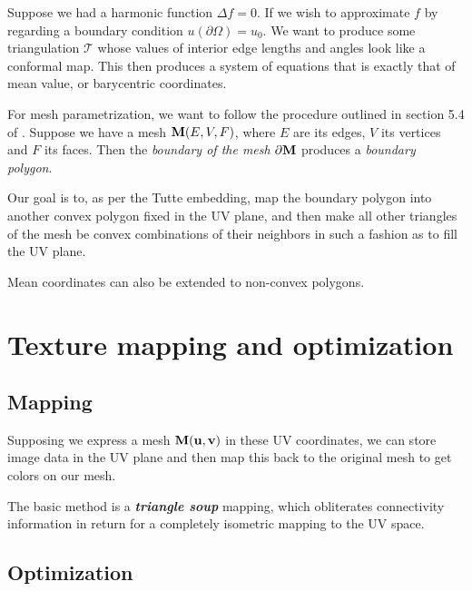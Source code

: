 \spa

Suppose we had a harmonic function $\Delta f = 0$. If we wish to
approximate $f$ by regarding a boundary condition 
$u(\partial \Omega) = u_0$. We want to produce some triangulation
$\mathcal{T}$ whose values of interior edge lengths and angles
look like a conformal map. This then produces a system of equations
that is exactly that of mean value, or barycentric coordinates.

\spa

For mesh parametrization, we want to follow
the procedure outlined in section 5.4 of \cite{floater2}.
Suppose we have a mesh $\bf{M}(E,V, F)$, where $E$ are its edges,
$V$ its vertices and $F$ its faces. Then the \emph{boundary of the mesh}
$\partial\bf{M}$ produces a \emph{boundary polygon}.

\spa

Our goal is to, as per the Tutte embedding, map the boundary polygon
into another convex polygon fixed in the UV plane, and then make all
other triangles of the mesh be convex combinations of their neighbors
in such a fashion as to fill the UV plane.

\spa

Mean coordinates can also be extended to non-convex polygons.

\section{Texture mapping and optimization}

\subsection{Mapping}

Supposing we express a mesh $\bf{M(u,v)}$ in these UV coordinates,
we can store image data in the UV plane and then map this back to the
original mesh to get colors on our mesh.

\spa

The basic method is a \emph{\textbf{triangle soup}} mapping, which
obliterates connectivity information in return for a completely
isometric mapping to the UV space.

\subsection{Optimization}